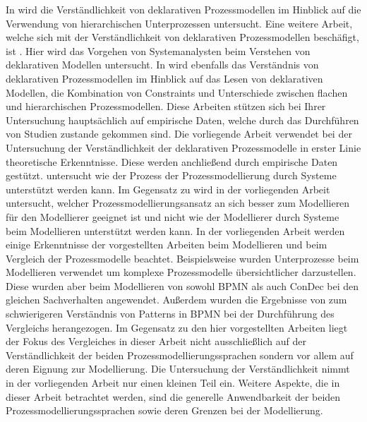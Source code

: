 In \cite{sabrina942} wird die Verständlichkeit von deklarativen Prozessmodellen im Hinblick auf die Verwendung von hierarchischen Unterprozessen untersucht. Eine weitere Arbeit, welche sich mit der Verständlichkeit von deklarativen Prozessmodellen beschäfigt, ist \cite{haisjackl2014understanding}. Hier wird das Vorgehen von Systemanalysten beim Verstehen von deklarativen Modellen untersucht. In \cite{sabrina933} wird ebenfalls das Verständnis von deklarativen Prozessmodellen im Hinblick auf das Lesen von deklarativen Modellen, die Kombination von Constraints und Unterschiede zwischen flachen und hierarchischen Prozessmodellen. Diese Arbeiten stützen sich bei Ihrer Untersuchung hauptsächlich auf empirische Daten, welche durch das Durchführen von Studien zustande gekommen sind. Die vorliegende Arbeit verwendet bei der Untersuchung der Verständlichkeit der deklarativen Prozessmodelle in erster Linie theoretische Erkenntnisse. Diese werden anchließend durch empirische Daten gestützt. \newline
\cite{pinggera2010investigating} untersucht wie der Prozess der Prozessmodellierung durch Systeme unterstützt werden kann. Im Gegensatz zu \cite{pinggera2010investigating} wird in der vorliegenden Arbeit untersucht, welcher Prozessmodellierungsansatz an sich besser zum Modellieren für den Modellierer geeignet ist und nicht wie der Modellierer durch Systeme beim Modellieren unterstützt werden kann.\newline
In der vorliegenden Arbeit werden einige Erkenntnisse der vorgestellten Arbeiten beim Modellieren und beim Vergleich der Prozessmodelle beachtet. Beispielsweise wurden Unterprozesse beim  Modellieren verwendet um komplexe Prozessmodelle übersichtlicher darzustellen. Diese wurden  aber beim Modellieren von sowohl BPMN als auch ConDec bei den gleichen Sachverhalten angewendet.\newline
Außerdem wurden die Ergebnisse von \cite{gruhn2006adopting} zum schwierigeren Verständnis von Patterns in BPMN bei der Durchführung des Vergleichs herangezogen.\newline
Im Gegensatz zu den hier vorgestellten Arbeiten liegt der Fokus des Vergleiches in dieser Arbeit nicht ausschließlich auf der Verständlichkeit der beiden Prozessmodellierungssprachen sondern vor allem auf deren Eignung zur Modellierung. Die Untersuchung der Verständlichkeit nimmt in der vorliegenden Arbeit nur einen kleinen Teil ein. Weitere Aspekte, die in dieser Arbeit betrachtet werden, sind die generelle Anwendbarkeit der beiden Prozessmodellierungssprachen sowie deren Grenzen bei der Modellierung. \newline


